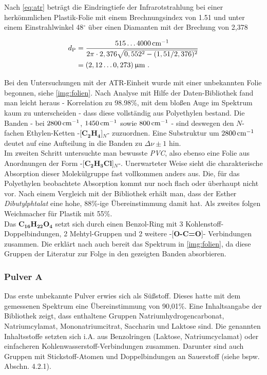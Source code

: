 \documentclass[a4paper,10pt,twocolumn]{article}
\newcommand{\ix}[1]{_\text{#1}}
\newcommand{\tilt}[1]{\textit{#1}}
\newcommand{\fett}[1]{\textbf{#1}}
\begin{document}
		Nach \autoref{eq:atr} betr\"agt die Eindringtiefe der Infrarotstrahlung bei einer herk\"ommlichen Plastik-Folie mit einem Brechnungsindex von 1.51 und unter einem Einstrahlwinkel 48$^{\circ}$ \"uber einen Diamanten mit der Brechung von 2,378 
		
		\begin{align}
			d\ix{P}&=\frac{\unit[515\dots4000]{cm^{-1}}}{2\pi\cdot2,376\sqrt{0,552^{2}-(1,51/2,376)^{2}}} \nonumber \\
			&=\unit[(2,12\dots0,273)]{\upmu m}\,\, .\nonumber
		\end{align}
		
		Bei den Untersuchungen mit der ATR-Einheit wurde mit einer unbekannten Folie begonnen, siehe \autoref{img:folien}. Nach Analyse mit Hilfe der Daten-Bibliothek fand man leicht heraus - Korrelation zu 98.98\%, mit dem blo{\ss}en Auge im Spektrum kaum zu unterscheiden - dass diese vollst\"andig aus Polyethylen bestand. Die Banden - bei $\unit[2800]{cm^{-1}}$, $\unit[1450]{cm^{-1}}$ sowie $\unit[800]{cm^{-1}}$ - sind deswegen den $N$-fachen Ethylen-Ketten -[\fett{C}$_{\fett{2}}$\fett{H}$_{\fett{4}}$]$_{N}$- zuzuordnen. Eine Substruktur um $\unit[2800]{cm^{-1}}$ deutet auf eine Aufteilung in die Banden zu $\Delta\nu\pm1$ hin.\\
		Im zweiten Schritt untersuchte man bewusste \tilt{PVC}, also ebenso eine Folie aus Anordnungen der Form -[\fett{C}$_{\fett{2}}$\fett{H}$_{\fett{3}}$\fett{Cl}]$_{N}$-. Unerwarteter Weise sieht die charakterische Absorption dieser Molek\"ulgruppe fast vollkommen anders aus. Die, f\"ur das Polyethylen beobachtete Absorption kommt nur noch flach oder \"uberhaupt nicht vor. Nach einem Vergleich mit der Bibliothek erh\"alt man, dass der Esther \tilt{Dibutylphtalat} eine hohe, 88\%-ige \"Ubereinstimmung damit hat. Als zweites folgen Weichmacher f\"ur Plastik mit 55\%.\\
		Das \fett{C}$_{\fett{16}}$\fett{H}$_{\fett{22}}$\fett{O}$_{\fett{4}}$ setzt sich durch einen Benzol-Ring mit 3 Kohlenstoff-Doppelbindungen, 2 Mehtyl-Gruppen und 2 weitere -[\fett{O-C=O}]- Verbindungen zusammen. Die erkl\"art nach \cite{FTIRAnl} auch bereit das Spektrum in \autoref{img:folien}, da diese Gruppen der Literatur zur Folge in den gezeigten Banden absorbieren.
		
		\subsubsection{Pulver A}

		Das erste unbekannte Pulver erwies sich als S\"u{\ss}stoff. Dieses hatte mit dem gemessenen Spektrum eine \"Ubereinstimmung von 90,01\%. Eine Inhaltsangabe der Bibliothek zeigt, dass enthaltene Gruppen Natriumhydrogencarbonat, Natriumcylamat, Mononatriumcitrat, Saccharin und Laktose sind. Die genannten Inhaltsstoffe setzten sich i.A. aus Benzolringen (Laktose, Natriumcyclamat) oder einfacheren Kohlenwasserstoff-Verbindungen zusammen. Darunter sind auch Gruppen mit Stickstoff-Atomen und Doppelbindungen an Sauerstoff (siehe bspw. Abschn. 4.2.1). 
\end{document}
